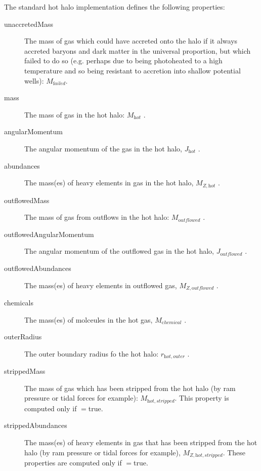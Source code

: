 The standard hot halo implementation defines the following properties:
\begin{description}
 \item [{\normalfont \ttfamily unaccretedMass}] The mass of gas which could have accreted onto the halo if it always accreted baryons and dark matter in the universal proportion, but which failed to do so (e.g. perhaps due to being photoheated to a high temperature and so being resistant to accretion into shallow potential wells): $M_{\mathrm failed}$.
 \item [{\normalfont \ttfamily mass}] The mass of gas in the hot halo: $M_{\mathrm hot}$ {\normalfont \ttfamily [hotHaloMass]}.
 \item [{\normalfont \ttfamily angularMomentum}] The angular momentum of the gas in the hot halo, $J_{\mathrm hot}$ {\normalfont \ttfamily [hotHaloAngularMomentum]}.
 \item [{\normalfont \ttfamily abundances}] The mass(es) of heavy elements in gas in the hot halo, $M_{Z, {\mathrm hot}}$ {\normalfont {}}.
 \item [{\normalfont \ttfamily outflowedMass}] The mass of gas from outflows in the hot halo: $M_{\mathrm outflowed}$ {\normalfont \ttfamily [hotHaloOutflowedMass]}.
 \item [{\normalfont \ttfamily outflowedAngularMomentum}] The angular momentum of the outflowed gas in the hot halo, $J_{\mathrm outflowed}$ {\normalfont \ttfamily [hotHaloOutflowedAngularMomentum]}.
 \item [{\normalfont \ttfamily outflowedAbundances}] The mass(es) of heavy elements in outflowed gas, $M_{Z, {\mathrm outflowed}}$ {\normalfont {}}.
 \item [{\normalfont \ttfamily chemicals}] The mass(es) of molceules in the hot gas, $M_{\mathrm chemical}$ {\normalfont {}}.
 \item [{\normalfont \ttfamily outerRadius}] The outer boundary radius fo the hot halo: $r_{\mathrm hot, outer}$ {\normalfont \ttfamily [hotHaloOuterRadius]}.
 \item [{\normalfont \ttfamily strippedMass}] The mass of gas which has been stripped from the hot halo (by ram pressure or tidal forces for example): $M_{\mathrm hot, stripped}$. This property is computed only if {\normalfont \ttfamily [hotHaloTrackStrippedGas]}$=${\normalfont \ttfamily true}.
 \item [{\normalfont \ttfamily strippedAbundances}] The mass(es) of heavy elements in gas that has been stripped from the hot halo (by ram pressure or tidal forces for example), $M_{Z, {\mathrm hot, stripped}}$. These properties are computed only if {\normalfont \ttfamily [hotHaloTrackStrippedGas]}$=${\normalfont \ttfamily true}.
\end{description}
